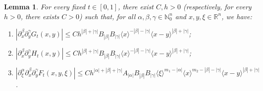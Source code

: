 \documentclass[11pt,reqno]{amsart}
\numberwithin{equation}{section}
\newtheorem{lemma}[theorem]{Lemma}
\begin{document}
\begin{lemma}\label{est_FGH}
	For every fixed $t\in[0,1]$, there exist $C,h>0$ 
	(respectively, for every $h>0$, there exists $C>0$) such that, for all $\alpha,\beta,\gamma\in\mathbb{N}_0^n$ and $x,y,\xi\in\mathbb{R}^n$, we have:
	\begin{enumerate}
		\item[(a)] $|\partial_x^\beta\partial_y^\gamma G_t(x,y)|\leq Ch^{|\beta|+|\gamma|}B_{|\beta|}B_{|\gamma|}\langle x\rangle^{-|\beta|-|\gamma|}\langle x-y\rangle^{|\beta|+|\gamma|}$;
		
		\item[(b)] $|\partial_x^\beta\partial_y^\gamma H_t(x,y)|\leq Ch^{|\beta|+|\gamma|}B_{|\beta|}B_{|\gamma|}\langle x\rangle^{-|\beta|-|\gamma|}\langle x-y\rangle^{|\beta|+|\gamma|}$;
		
		\item[(c)] $|\partial_\xi^\alpha\partial_x^\beta\partial_y^\gamma F_t(x,y,\xi)|\leq Ch^{|\alpha|+|\beta|+|\gamma|}A_{|\alpha|}B_{|\beta|}B_{|\gamma|} \langle\xi\rangle^{m_1-|\alpha|} \langle x\rangle^{m_2-|\beta|-|\gamma|}\langle x-y\rangle^{|\beta|+|\gamma|}$.
	\end{enumerate}
\end{lemma}
%
\end{document}
